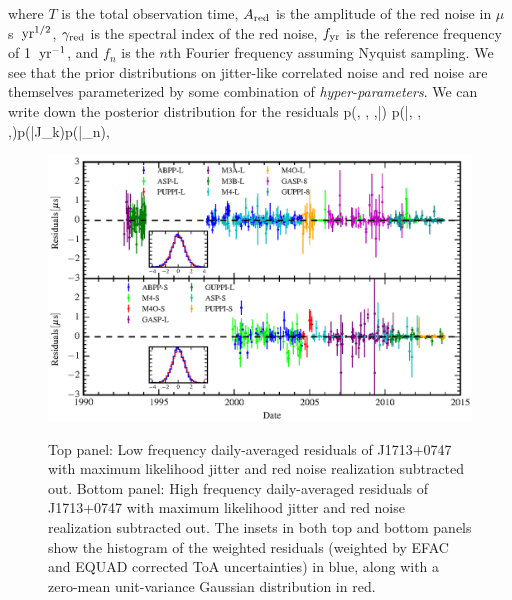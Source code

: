 \ee
where $T$ is the total observation time, $A_{\rm red}$ is the amplitude of the
red noise in $\mu$s~${\rm yr}^{1/2}$, $\gamma_{\rm red}$ is the spectral index of the red noise, $f_{\rm
yr}$ is the reference frequency of 1~${\rm yr}^{-1}$, and $f_{n}$ is the $n$th
Fourier frequency assuming Nyquist sampling. We see that the prior
distributions on jitter-like correlated noise and red noise are themselves
parameterized by some combination of \emph{hyper-parameters}. 
We can write down the posterior distribution for the residuals
\be
p(\boldsymbol{\epsilon}, , ,\boldsymbol{\phi}|\delta{}) \propto
p(\delta{}|\boldsymbol{\epsilon}, , ,\boldsymbol{\phi})p(|J_{k})p(|\rho_{n}),
\ee

\begin{figure}[!ht]
\includegraphics[scale=1.0]{fig4.eps} \\ 
\caption{\label{fig:detres} Top panel: Low frequency daily-averaged residuals of J1713+0747 with maximum likelihood
jitter and red noise realization subtracted out. Bottom panel: High frequency daily-averaged residuals of J1713+0747 with maximum likelihood jitter and red noise realization subtracted out. The insets in both top and bottom panels show the histogram of the weighted residuals (weighted by EFAC and EQUAD corrected ToA uncertainties) in blue, along with a zero-mean unit-variance Gaussian distribution in red.}
\end{figure} 

